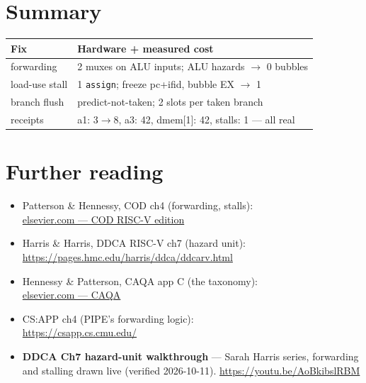 \section{Summary}
\label{sec:summary07}
\begin{tabularx}{\linewidth}{@{}l X@{}}
\toprule
\textbf{Fix} & \textbf{Hardware + measured cost} \\
\midrule
forwarding & 2 muxes on ALU inputs; ALU hazards $\to$ 0 bubbles \\
load-use stall & 1 \texttt{assign}; freeze pc+ifid, bubble EX $\to$ 1 \\
branch flush & predict-not-taken; 2 slots per taken branch \\
receipts & a1: 3$\to$8, a3: 42, dmem[1]: 42, stalls: 1 --- all real \\
\bottomrule
\end{tabularx}

\section*{Further reading}
\label{sec:further07}
\begin{itemize}
\item Patterson \& Hennessy, COD ch4 (forwarding, stalls):\\
      \href{https://www.elsevier.com/books/computer-organization-and-design-risc-v-edition/patterson/978-0-12-820331-6}{elsevier.com --- COD RISC-V edition}
\item Harris \& Harris, DDCA RISC-V ch7 (hazard unit):\\
      \url{https://pages.hmc.edu/harris/ddca/ddcarv.html}
\item Hennessy \& Patterson, CAQA app C (the taxonomy):\\
      \href{https://www.elsevier.com/books/computer-architecture/hennessy/978-0-12-811905-1}{elsevier.com --- CAQA}
\item CS:APP ch4 (PIPE's forwarding logic):\\
      \url{https://csapp.cs.cmu.edu/}
\end{itemize}

\begin{rulebox}
\begin{itemize}
\item \textbf{DDCA Ch7 hazard-unit walkthrough} --- Sarah Harris
      series, forwarding and stalling drawn live (verified
      2026-10-11). \url{https://youtu.be/AoBkibslRBM}
\end{itemize}
\end{rulebox}

